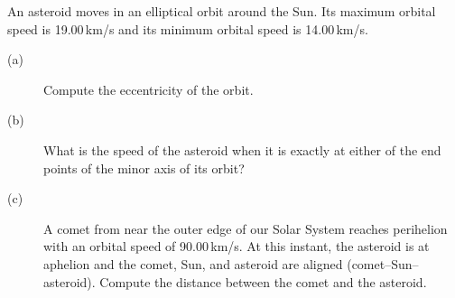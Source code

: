 An asteroid moves in an elliptical orbit around the Sun. Its maximum orbital speed is 19.00\,km/s and its minimum orbital speed is 14.00\,km/s.
\begin{description}
\item[(a)] Compute the eccentricity of the orbit.
\item[(b)] What is the speed of the asteroid when it is exactly at either of the end points of the minor axis of its orbit?
\item[(c)] A comet from near the outer edge of our Solar System reaches perihelion with an orbital speed of 90.00\,km/s. At this instant, the asteroid is at aphelion and the comet, Sun, and asteroid are aligned (comet--Sun--asteroid). Compute the distance between the comet and the asteroid.
\end{description}
